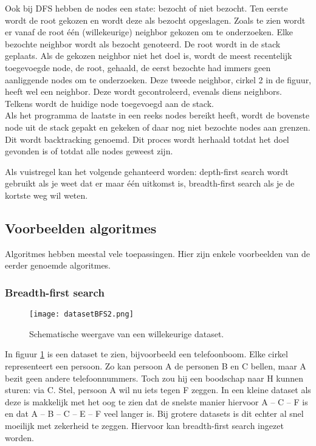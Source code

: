 Ook bij DFS hebben de nodes een state: bezocht of niet bezocht.
Ten eerste wordt de root gekozen en wordt deze als bezocht opgeslagen. Zoals te zien wordt er vanaf de root één (willekeurige) neighbor gekozen om te onderzoeken. Elke bezochte neighbor wordt als bezocht genoteerd. De root wordt in de stack geplaats. Als de gekozen neighbor niet het doel is, wordt de meest recentelijk toegevoegde node, de root, gehaald, de eerst bezochte had immers geen aanliggende nodes om te onderzoeken. Deze tweede neighbor, cirkel 2 in de figuur, heeft wel een neighbor. Deze wordt gecontroleerd, evenals diens neighbors. Telkens wordt de huidige node toegevoegd aan de stack.\\
Als het programma de laatste in een reeks nodes bereikt heeft, wordt de bovenste node uit de stack gepakt en gekeken of daar nog niet bezochte nodes aan grenzen. Dit wordt backtracking genoemd.
Dit proces wordt herhaald totdat het doel gevonden is of totdat alle nodes geweest zijn.

Als vuistregel kan het volgende gehanteerd worden: depth-first search wordt gebruikt als je weet dat er maar één uitkomst is, breadth-first search als je de kortste weg wil weten.
\subsection{Voorbeelden algoritmes}
Algoritmes hebben meestal vele toepassingen. Hier zijn enkele voorbeelden van de eerder genoemde algoritmes.
\subsubsection{Breadth-first search}
\begin{figure}[h]
  \centering
    \texttt{[image: datasetBFS2.png]}
  \caption{Schematische weergave van een willekeurige dataset.}
  \label{fig:datasetBFS2}
\end{figure}

In figuur \ref{fig:datasetBFS2} is een dataset te zien, bijvoorbeeld een telefoonboom. Elke cirkel representeert een persoon. Zo kan persoon A de personen B en C bellen, maar A bezit geen andere telefoonnummers. Toch zou hij een boodschap naar H kunnen sturen: via C. 
Stel, persoon A wil nu iets tegen F zeggen. In een kleine dataset als deze is makkelijk met het oog te zien dat de snelste manier hiervoor A – C – F is en dat A – B – C – E – F veel langer is. Bij grotere datasets is dit echter al snel moeilijk met zekerheid te zeggen. Hiervoor kan breadth-first search ingezet worden.

